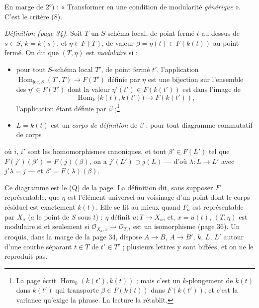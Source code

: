 \documentclass[11pt,a4paper]{article}
\begin{document}
En marge de 2°) : « Transformer en une condition de modularité
\emph{générique} ». C'est le critère (8).

\emph{Définition (page 34).} Soit $T$ un $S$-schéma local, de point fermé
$t$ au-dessus de $s \in S$, $k = k(s)$, et $\eta \in F(T)$, de valeur $\beta =
\eta(t) \in F(k(t))$ au point fermé. On dit que $(T, \eta)$ est
\emph{modulaire} si :
\begin{itemize}
\item[1°)] pour tout $S$-schéma local $T'$, de point fermé $t'$, l'application
$\operatorname{Hom}_{\mathrm{loc}, S}(T', T) \to F(T')$ définie par $\eta$
est une bijection sur l'ensemble des $\eta' \in F(T')$ dont la valeur
$\eta'(t') \in F(k(t'))$ est dans l'image de
\[
\operatorname{Hom}_k\bigl(k(t), k(t')\bigr) \longrightarrow F(k(t')),
\]
l'application étant définie par $\beta$ ;\footnote{La page écrit
$\operatorname{Hom}_k(k(t'), k(t))$ ; mais c'est un $k$-plongement de $k(t)$
dans $k(t')$ qui transporte $\beta \in F(k(t))$ dans $F(k(t'))$, et c'est la
variance qu'exige la phrase. La lecture la rétablit.}
\item[2°)] $L = k(t)$ est un \emph{corps de définition} de $\beta$ : pour tout
diagramme commutatif de corps
\end{itemize}


où $i$, $i'$ sont les homomorphismes canoniques, et tout $\beta' \in F(L')$
tel que $F(j')(\beta') = F(j)(\beta)$, on a $j'(L') \supset j(L)$ — d'où
$\lambda : L \to L'$ avec $j' \lambda = j$ — et $\beta' = F(\lambda)(\beta)$.

Ce diagramme est le (Q) de la page. La définition dit, sans supposer $F$
représentable, que $\eta$ est l'élément universel au voisinage d'un point
dont le corps résiduel est exactement $k(t)$. Elle se lit au mieux quand
$F_a$ est représentable par $X_a$ ($a$ le point de $S$ sous $t$) : $\eta$
définit $u : T \to X_a$, et, $x = u(t)$, $(T, \eta)$ est modulaire si et
seulement si $\mathcal{O}_{X_a, x} \to \mathcal{O}_{T,t}$ est un
isomorphisme (page 36). Un croquis, dans la marge de la page 34, dispose
$A \to B$, $A \to B'$, $k$, $L$, $L'$ autour d'une courbe séparant $t \in T$
de $t' \in T'$ ; plusieurs lettres y sont biffées, et on ne le reproduit pas.
\end{document}
